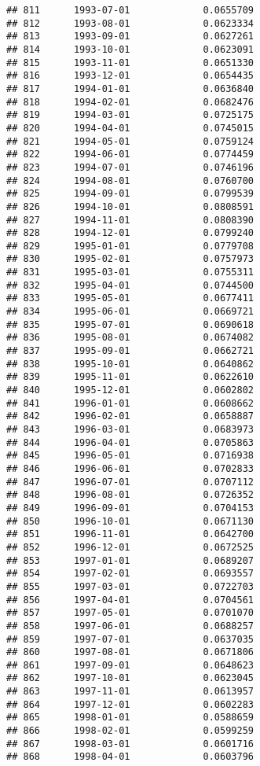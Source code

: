 \documentclass[
]{article}
\begin{document}
\begin{verbatim}
## 811      1993-07-01             0.0655709
## 812      1993-08-01             0.0623334
## 813      1993-09-01             0.0627261
## 814      1993-10-01             0.0623091
## 815      1993-11-01             0.0651330
## 816      1993-12-01             0.0654435
## 817      1994-01-01             0.0636840
## 818      1994-02-01             0.0682476
## 819      1994-03-01             0.0725175
## 820      1994-04-01             0.0745015
## 821      1994-05-01             0.0759124
## 822      1994-06-01             0.0774459
## 823      1994-07-01             0.0746196
## 824      1994-08-01             0.0760700
## 825      1994-09-01             0.0799539
## 826      1994-10-01             0.0808591
## 827      1994-11-01             0.0808390
## 828      1994-12-01             0.0799240
## 829      1995-01-01             0.0779708
## 830      1995-02-01             0.0757973
## 831      1995-03-01             0.0755311
## 832      1995-04-01             0.0744500
## 833      1995-05-01             0.0677411
## 834      1995-06-01             0.0669721
## 835      1995-07-01             0.0690618
## 836      1995-08-01             0.0674082
## 837      1995-09-01             0.0662721
## 838      1995-10-01             0.0640862
## 839      1995-11-01             0.0622610
## 840      1995-12-01             0.0602802
## 841      1996-01-01             0.0608662
## 842      1996-02-01             0.0658887
## 843      1996-03-01             0.0683973
## 844      1996-04-01             0.0705863
## 845      1996-05-01             0.0716938
## 846      1996-06-01             0.0702833
## 847      1996-07-01             0.0707112
## 848      1996-08-01             0.0726352
## 849      1996-09-01             0.0704153
## 850      1996-10-01             0.0671130
## 851      1996-11-01             0.0642700
## 852      1996-12-01             0.0672525
## 853      1997-01-01             0.0689207
## 854      1997-02-01             0.0693557
## 855      1997-03-01             0.0722703
## 856      1997-04-01             0.0704561
## 857      1997-05-01             0.0701070
## 858      1997-06-01             0.0688257
## 859      1997-07-01             0.0637035
## 860      1997-08-01             0.0671806
## 861      1997-09-01             0.0648623
## 862      1997-10-01             0.0623045
## 863      1997-11-01             0.0613957
## 864      1997-12-01             0.0602283
## 865      1998-01-01             0.0588659
## 866      1998-02-01             0.0599259
## 867      1998-03-01             0.0601716
## 868      1998-04-01             0.0603796

\end{verbatim}
\end{document}
